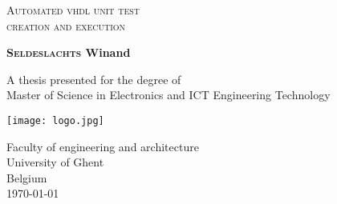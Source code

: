 \begin{titlepage}
    \begin{center}
        \vspace*{1cm}
        
        
        \textsc{\LARGE{Automated vhdl unit test \\ creation and execution}}
        
        
        \vspace{1.5cm}
        

        \textbf{\textsc{Seldeslachts} Winand}
        
        \vfill
        
        A thesis presented for the degree of\\
        Master of Science in Electronics and ICT Engineering Technology
        
        \vspace{0.8cm}
        
        \texttt{[image: logo.jpg]}
        
        Faculty of engineering and architecture\\
        University of Ghent\\
        Belgium\\
        \today
        
    \end{center}
\end{titlepage}